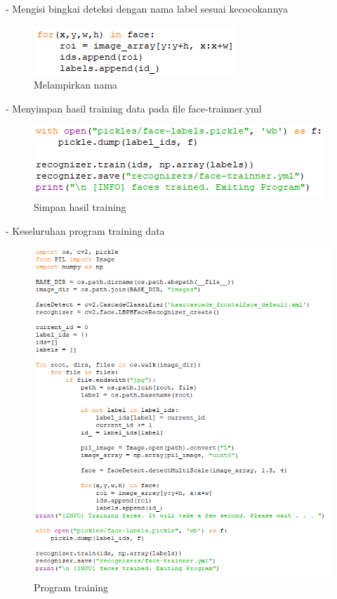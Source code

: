 \begin{enumerate}
    - Mengisi bingkai deteksi dengan nama label sesuai kecocokannya
    \begin{figure}[h!]
        \centering
        \includegraphics[width=0.5\linewidth]{images/fr_cam12.PNG}
        \caption{Melampirkan nama}
    \end{figure}
    \newpage
    - Menyimpan hasil training data pada file face-trainner.yml
    \begin{figure}[h!]
        \centering
        \includegraphics[width=0.7\linewidth]{images/fr_cam13.PNG}
        \caption{Simpan hasil training}
    \end{figure}

    - Keseluruhan program training data
    \begin{figure}[h!]
        \centering
        \includegraphics[width=1\linewidth]{images/fr_cam14.PNG}
        \caption{Program training}
    \end{figure}


\end{enumerate}
